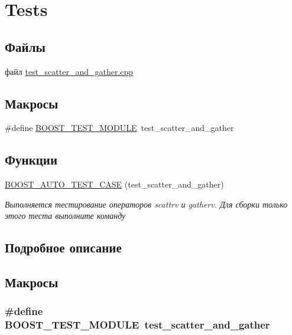 \hypertarget{group__Tests}{\section{Tests}
\label{group__Tests}
}
\subsection*{Файлы}
\begin{DoxyCompactItemize}
\item 
файл \hyperlink{test__scatter__and__gather_8cpp}{test\-\_\-scatter\-\_\-and\-\_\-gather.\-cpp}
\end{DoxyCompactItemize}
\subsection*{Макросы}
\begin{DoxyCompactItemize}
\item 
\#define \hyperlink{group__Tests_ga6b2a3852db8bb19ab6909bac01859985}{B\-O\-O\-S\-T\-\_\-\-T\-E\-S\-T\-\_\-\-M\-O\-D\-U\-L\-E}~test\-\_\-scatter\-\_\-and\-\_\-gather
\end{DoxyCompactItemize}
\subsection*{Функции}
\begin{DoxyCompactItemize}
\item 
\hyperlink{group__Tests_ga8e719c4f477459544627877df12f3a14}{B\-O\-O\-S\-T\-\_\-\-A\-U\-T\-O\-\_\-\-T\-E\-S\-T\-\_\-\-C\-A\-S\-E} (test\-\_\-scatter\-\_\-and\-\_\-gather)
\begin{DoxyCompactList}\small\item\em Выполняется тестирование операторов scattrv и gatherv. Для сборки только этого теста выполните команду \end{DoxyCompactList}\end{DoxyCompactItemize}


\subsection{Подробное описание}


\subsection{Макросы}
\hypertarget{group__Tests_ga6b2a3852db8bb19ab6909bac01859985}{
\subsubsection[{B\-O\-O\-S\-T\-\_\-\-T\-E\-S\-T\-\_\-\-M\-O\-D\-U\-L\-E}]{\setlength{\rightskip}{0pt plus 5cm}\#define B\-O\-O\-S\-T\-\_\-\-T\-E\-S\-T\-\_\-\-M\-O\-D\-U\-L\-E~test\-\_\-scatter\-\_\-and\-\_\-gather}}\label{group__Tests_ga6b2a3852db8bb19ab6909bac01859985}



